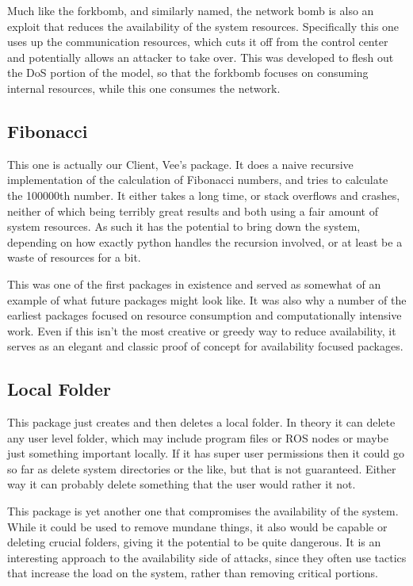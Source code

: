 \documentclass[IEEEtran,letterpaper,10pt,notitlepage,draftclsnofoot]{article}
\begin{document}
Much like the forkbomb, and similarly named, the network bomb is also an exploit that reduces the availability of the system resources.
Specifically this one uses up the communication resources, which cuts it off from the control center and potentially allows an attacker to take over.
This was developed to flesh out the DoS portion of the model, so that the forkbomb focuses on consuming internal resources, while this one consumes the network.

\subsection{Fibonacci}
This one is actually our Client, Vee's package. It does a naive recursive implementation of the calculation of Fibonacci
numbers, and tries to calculate the 100000th number. It either takes a long time, or stack overflows and crashes, neither 
of which being terribly great results and both using a fair amount of system resources. As such it has the potential to 
bring down the system, depending on how exactly python handles the recursion involved, or at least be a waste of resources 
for a bit.

This was one of the first packages in existence and served as somewhat of an example of what future packages might look like. 
It was also why a number of the earliest packages focused on resource consumption and computationally intensive work.
Even if this isn't the most creative or greedy way to reduce availability, it serves as an elegant and classic proof of concept for availability focused packages.

\subsection{Local Folder}
This package just creates and then deletes a local folder. In theory it can delete any user level folder, which may include
program files or ROS nodes or maybe just something important locally. If it has super user permissions then it could go so
far as delete system directories or the like, but that is not guaranteed. Either way it can probably delete something that
the user would rather it not.

This package is yet another one that compromises the availability of the system. 
While it could be used to remove mundane things, it also would be capable or deleting crucial folders, giving it the potential to be quite dangerous.
It is an interesting approach to the availability side of attacks, since they often use tactics that increase the load on the system, rather than removing critical portions.
\end{document}
